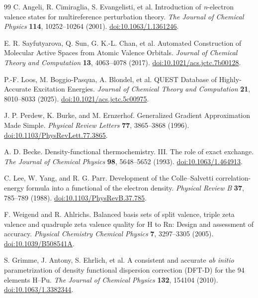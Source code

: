 \begin{thebibliography}{99}
C. Angeli, R. Cimiraglia, S. Evangelisti, et al.
Introduction of \emph{n}-electron valence states for multireference perturbation theory.
\emph{The Journal of Chemical Physics} \textbf{114}, 10252--10264 (2001).
\href{https://doi.org/10.1063/1.1361246}{doi:10.1063/1.1361246}.

E. R. Sayfutyarova, Q. Sun, G. K.-L. Chan, et al.
Automated Construction of Molecular Active Spaces from Atomic Valence Orbitals.
\emph{Journal of Chemical Theory and Computation} \textbf{13}, 4063--4078 (2017).
\href{https://doi.org/10.1021/acs.jctc.7b00128}{doi:10.1021/acs.jctc.7b00128}.

P.-F. Loos, M. Boggio-Pasqua, A. Blondel, et al.
QUEST Database of Highly-Accurate Excitation Energies.
\emph{Journal of Chemical Theory and Computation} \textbf{21}, 8010--8033 (2025).
\href{https://doi.org/10.1021/acs.jctc.5c00975}{doi:10.1021/acs.jctc.5c00975}.

J. P. Perdew, K. Burke, and M. Ernzerhof.
Generalized Gradient Approximation Made Simple.
\emph{Physical Review Letters} \textbf{77}, 3865--3868 (1996).
\href{https://doi.org/10.1103/PhysRevLett.77.3865}{doi:10.1103/PhysRevLett.77.3865}.

A. D. Becke.
Density-functional thermochemistry. III. The role of exact exchange.
\emph{The Journal of Chemical Physics} \textbf{98}, 5648--5652 (1993).
\href{https://doi.org/10.1063/1.464913}{doi:10.1063/1.464913}.

C. Lee, W. Yang, and R. G. Parr.
Development of the Colle--Salvetti correlation-energy formula into a functional of the electron density.
\emph{Physical Review B} \textbf{37}, 785--789 (1988).
\href{https://doi.org/10.1103/PhysRevB.37.785}{doi:10.1103/PhysRevB.37.785}.

F. Weigend and R. Ahlrichs.
Balanced basis sets of split valence, triple zeta valence and quadruple zeta valence quality for H to Rn: Design and assessment of accuracy.
\emph{Physical Chemistry Chemical Physics} \textbf{7}, 3297--3305 (2005).
\href{https://doi.org/10.1039/B508541A}{doi:10.1039/B508541A}.

S. Grimme, J. Antony, S. Ehrlich, et al.
A consistent and accurate \emph{ab initio} parametrization of density functional dispersion correction (DFT-D) for the 94 elements H--Pu.
\emph{The Journal of Chemical Physics} \textbf{132}, 154104 (2010).
\href{https://doi.org/10.1063/1.3382344}{doi:10.1063/1.3382344}.


\end{thebibliography}
